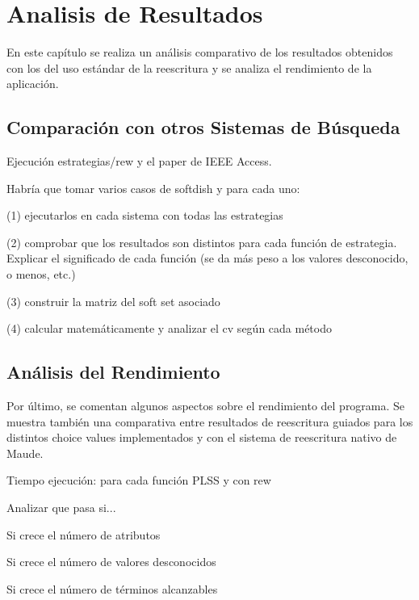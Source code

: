 
\chapter{Analisis de Resultados}
\label{cap:analisis}


En este capítulo se realiza un análisis comparativo de los resultados obtenidos con los del uso estándar de la reescritura y se analiza el rendimiento de la aplicación.


\section{Comparación con otros Sistemas de Búsqueda}

Ejecución estrategias/rew y el paper de IEEE Access.
\smallskip

Habría que tomar varios casos de softdish y para cada uno:

(1) ejecutarlos en cada sistema con todas las estrategias

(2) comprobar que los resultados son distintos para cada función de estrategia.
Explicar el significado de cada función (se da más peso a los valores desconocido, o menos, etc.) 

(3) construir la matriz del soft set asociado

(4) calcular matemáticamente y analizar el cv según cada método




\section{Análisis del Rendimiento}
Por último, se comentan algunos aspectos sobre el rendimiento del programa.
Se muestra también una comparativa entre resultados de reescritura guiados para los distintos choice values implementados y con el sistema de reescritura nativo de Maude.
\medskip

Tiempo ejecución:
para cada función PLSS
y con rew
\smallskip

Analizar que pasa si...

Si crece el número de atributos

Si crece el número de valores desconocidos

Si crece el número de términos alcanzables
\smallskip

